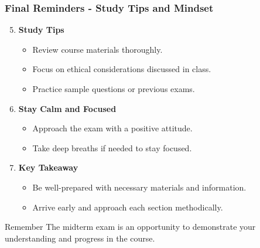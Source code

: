 \documentclass[aspectratio=169]{beamer}
\begin{document}
\begin{frame}[fragile]
    \frametitle{Final Reminders - Study Tips and Mindset}
    \begin{enumerate}
        \setcounter{enumi}{4}
        \item \textbf{Study Tips}
            \begin{itemize}
                \item Review course materials thoroughly.
                \item Focus on ethical considerations discussed in class.
                \item Practice sample questions or previous exams.
            \end{itemize}
        
        \item \textbf{Stay Calm and Focused}
            \begin{itemize}
                \item Approach the exam with a positive attitude.
                \item Take deep breaths if needed to stay focused.
            \end{itemize}
        
        \item \textbf{Key Takeaway}
            \begin{itemize}
                \item Be well-prepared with necessary materials and information.
                \item Arrive early and approach each section methodically.
            \end{itemize}
    \end{enumerate}
    \begin{block}{Remember}
        The midterm exam is an opportunity to demonstrate your understanding and progress in the course.
    \end{block}
\end{frame}
\end{document}
